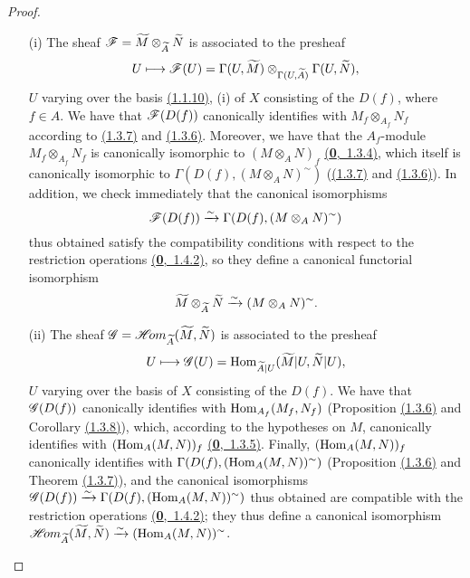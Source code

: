\begin{proof}
\label{proof-cor-1.1.3.12}
\medskip\noindent
\begin{itemize}
  \item[(i)] The sheaf $\mathscr{F}=\widetilde{M}\otimes_{\widetilde{A}}\widetilde{N}$ is associated to
    the presheaf
    \[
      U\longmapsto\mathscr{F}(U)
      =\Gamma(U,\widetilde{M})\otimes_{\Gamma(U,\widetilde{A})}\Gamma(U,\widetilde{N}),
    \]
    $U$ varying over the basis \hyperref[prop-1.1.1.10]{(1.1.10)}, (i) of $X$ consisting of the
    $D(f)$, where $f\in A$. We have that $\mathscr{F}(D(f))$ canonically identifies with
    $M_f\otimes_{A_f}N_f$ according to \hyperref[thm-1.1.3.7]{(1.3.7)} and \hyperref[prop-1.1.3.6]{(1.3.6)}.
    Moreover, we have that the $A_f$-module $M_f\otimes_{A_f}N_f$ is canonically
    isomorphic to $(M\otimes_A N)_f$ \hyperref[env-0.1.3.4]{(\textbf{0},~1.3.4)}, which itself is canonically
    isomorphic to $\Gamma(D(f),(M\otimes_A N)^\sim)$ (\hyperref[thm-1.1.3.7]{(1.3.7)} and
    \hyperref[prop-1.1.3.6]{(1.3.6)}). In addition, we check immediately that the canonical
    isomorphisms
    \[
      \mathscr{F}(D(f))\xrightarrow{\sim}\Gamma(D(f),(M\otimes_A N)^\sim)
    \]
    thus obtained satisfy the compatibility conditions with respect to the restriction
    operations \hyperref[env-0.1.4.2]{(\textbf{0},~1.4.2)}, so they define a canonical functorial isomorphism
    \[
      \widetilde{M}\otimes_{\widetilde{A}}\widetilde{N}\xrightarrow{\sim}(M\otimes_A N)^\sim.
    \]
  \item[(ii)] The sheaf $\mathscr{G}=\mathscr{H}\!{om}_{\widetilde{A}}(\widetilde{M},\widetilde{N})$ is associated
    to the presheaf
    \[
      U\longmapsto\mathscr{G}(U)={\mathop{\mathrm{Hom}}\nolimits}_{\widetilde{A}|U}(\widetilde{M}|U,\widetilde{N}|U),
    \]
    $U$ varying over the basis of $X$ consisting of the $D(f)$. We have that $\mathscr{G}(D(f))$ canonically
    identifies with ${\mathop{\mathrm{Hom}}\nolimits}_{A_f}(M_f,N_f)$ (Proposition \hyperref[prop-1.1.3.6]{(1.3.6)} and
    Corollary \hyperref[cor-1.1.3.8]{(1.3.8)}), which, according to the hypotheses on $M$, canonically
    identifies with $({\mathop{\mathrm{Hom}}\nolimits}_A(M,N))_f$ \hyperref[env-0.1.3.5]{(\textbf{0},~1.3.5)}. Finally, $({\mathop{\mathrm{Hom}}\nolimits}_A(M,N))_f$
    canonically identifies with $\Gamma(D(f),({\mathop{\mathrm{Hom}}\nolimits}_A(M,N))^\sim)$ (Proposition \hyperref[prop-1.1.3.6]{(1.3.6)}
    and Theorem \hyperref[thm-1.1.3.7]{(1.3.7)}), and the canonical isomorphisms
    $\mathscr{G}(D(f))\xrightarrow{\sim}\Gamma(D(f),({\mathop{\mathrm{Hom}}\nolimits}_A(M,N))^\sim)$ thus obtained are compatible with the restriction
    operations \hyperref[env-0.1.4.2]{(\textbf{0},~1.4.2)}; they thus define a canonical isomorphism
    $\mathscr{H}\!{om}_{\widetilde{A}}(\widetilde{M},\widetilde{N})\xrightarrow{\sim}({\mathop{\mathrm{Hom}}\nolimits}_A(M,N))^\sim$.
\end{itemize}
\end{proof}

